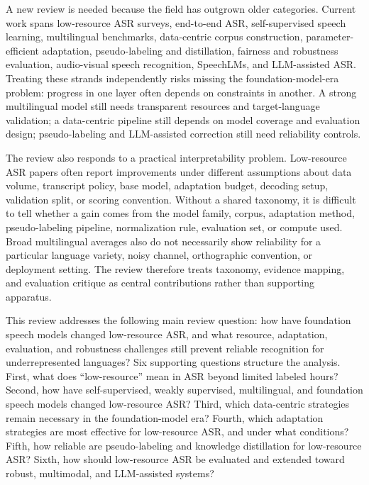 \documentclass[pdflatex,sn-basic]{sn-jnl}
\theoremstyle{thmstyleone}
\theoremstyle{thmstyletwo}
\theoremstyle{thmstylethree}
\begin{document}
A new review is needed because the field has outgrown older categories. Current work spans low-resource ASR surveys, end-to-end ASR, self-supervised speech learning, multilingual benchmarks, data-centric corpus construction, parameter-efficient adaptation, pseudo-labeling and distillation, fairness and robustness evaluation, audio-visual speech recognition, SpeechLMs, and LLM-assisted ASR. Treating these strands independently risks missing the foundation-model-era problem: progress in one layer often depends on constraints in another. A strong multilingual model still needs transparent resources and target-language validation; a data-centric pipeline still depends on model coverage and evaluation design; pseudo-labeling and LLM-assisted correction still need reliability controls.

The review also responds to a practical interpretability problem. Low-resource ASR papers often report improvements under different assumptions about data volume, transcript policy, base model, adaptation budget, decoding setup, validation split, or scoring convention. Without a shared taxonomy, it is difficult to tell whether a gain comes from the model family, corpus, adaptation method, pseudo-labeling pipeline, normalization rule, evaluation set, or compute used. Broad multilingual averages also do not necessarily show reliability for a particular language variety, noisy channel, orthographic convention, or deployment setting. The review therefore treats taxonomy, evidence mapping, and evaluation critique as central contributions rather than supporting apparatus.

This review addresses the following main review question: how have foundation speech models changed low-resource ASR, and what resource, adaptation, evaluation, and robustness challenges still prevent reliable recognition for underrepresented languages? Six supporting questions structure the analysis. First, what does ``low-resource'' mean in ASR beyond limited labeled hours? Second, how have self-supervised, weakly supervised, multilingual, and foundation speech models changed low-resource ASR? Third, which data-centric strategies remain necessary in the foundation-model era? Fourth, which adaptation strategies are most effective for low-resource ASR, and under what conditions? Fifth, how reliable are pseudo-labeling and knowledge distillation for low-resource ASR? Sixth, how should low-resource ASR be evaluated and extended toward robust, multimodal, and LLM-assisted systems?
\end{document}
